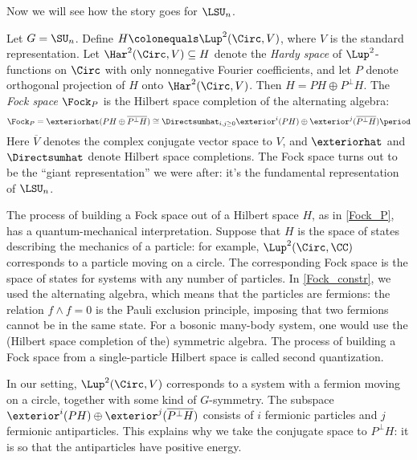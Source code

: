 Now we will see how the story goes for $\LSU_n$.
\begin{construction}
\label{Fock_constr}
	Let $G = \SU_n$. Define $H \colonequals \Lup^2(\Circ, V)$, where $V$ is the standard
	representation. Let $\Har^2(\Circ, V)\subseteq H$ denote the \emph{Hardy
	space} of
	$\Lup^2$-functions on $\Circ$ with only nonnegative Fourier coefficients, and let
	$P$ denote orthogonal projection of $H$ onto $\Har^2(\Circ, V)$. Then $H = PH \oplus
	P^\perp H$. The \emph{Fock space} $\Fock_P$ is the Hilbert
	space completion of the alternating algebra:
	\begin{equation}
	\label{Fock_P}
	\Fock_P = \exteriorhat (PH \oplus \overline{P^\perp H}) \cong
	\Directsumhat_{i,j \geq 0} \exterior^i(PH) \oplus \exterior^j(\overline{P^\perp H})\period
	\end{equation}
	Here $\overline V$ denotes the complex conjugate vector space to $V$, and $\exteriorhat$ and
	$\Directsumhat $ denote Hilbert space completions. The Fock space
	turns out to be the ``giant representation'' we were after: it's the
	fundamental representation of $\LSU_n$.
\end{construction}
\begin{remark}
The process of building a Fock space out of a Hilbert space $H$, as in \eqref{Fock_P}, has a quantum-mechanical
interpretation. Suppose that $H$ is the space of states describing the mechanics of a particle: for example,
$\Lup^2(\Circ, \CC)$ corresponds to a particle moving on a circle. The corresponding Fock space is the space of
states for systems with any number of particles. In \cref{Fock_constr}, we used the alternating algebra, which
means that the particles are fermions: the relation $f\wedge f = 0$ is the Pauli exclusion principle, imposing that
two fermions cannot be in the same state. For a bosonic many-body system, one would use the (Hilbert space
completion of the) symmetric algebra.%
%
%
The process of building a Fock space from a single-particle Hilbert space is called second
quantization.

In our setting, $\Lup^2(\Circ, V)$ corresponds to a system with a fermion moving on a circle, together with some
kind of $G$-symmetry. The subspace $\exterior^i(PH) \oplus \exterior^j(\overline{P^\perp H})$ consists of $i$ fermionic
particles and $j$ fermionic antiparticles. This explains why we take the conjugate space to $P^\perp H$: it is so
that the antiparticles have positive energy.
\end{remark}
